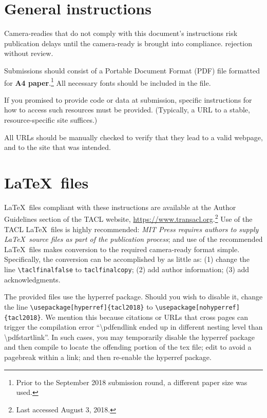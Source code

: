 \documentclass[11pt,a4paper]{article}
\newcommand{\Taclpaper}{Camera-ready\xspace}
\newcommand{\Taclpapers}{Camera-readies\xspace}
\newcommand{\Taclpaper}{Submission\xspace}
\newcommand{\Taclpapers}{{\Taclpaper}s\xspace}
\begin{document}
\section{General instructions}

\Taclpapers that do not comply with this document's instructions
risk
\iftaclfinal
publication delays until the camera-ready is brought into compliance.
\else
rejection without review.
\fi


Submissions should consist of a Portable Document Format (PDF) file formatted
for  \textbf{A4 paper}.\footnote{Prior to the September 2018 submission round, a
different paper size was used.} All necessary fonts should be
included in the  file.

If you promised to provide code or data at submission, specific instructions for
how to access such resources must be provided.  (Typically, a URL to a stable,
resource-specific site suffices.)

All URLs should be manually checked to verify that they
lead to a valid webpage, and to the site that was intended.



\section{\LaTeX\ files}

\LaTeX\ files compliant with these instructions are available at the
Author Guidelines section of the
TACL website, \href{https://www.transacl.org/}
{https://www.transacl.org}.\footnote{Last accessed August 3, 2018.} Use of the
TACL \LaTeX\ files is highly recommended: \emph{MIT Press requires authors to
supply \LaTeX\ source files as part of the publication process}; and
use of the recommended \LaTeX\ files makes conversion to the
required camera-ready format simple.
\iftaclfinal
Specifically, the conversion can be accomplished by as little as: (1) change the
line
\verb+\taclfinalfalse+ to \verb+taclfinalcopy+; (2) add author information;
(3) add acknowledgments.
\fi


The provided files use the hyperref package.  Should you wish to disable it,
change the line
\verb+\usepackage[hyperref]{tacl2018}+
to
\verb+\usepackage[nohyperref]{tacl2018}+.
We mention this because citations or URLs that cross pages can trigger the
compilation error ``{\textbackslash}pdfendlink ended up in different nesting
level than {\textbackslash}pdfstartlink''.  In such cases, you may temporarily
disable the hyperref package and then compile to locate the offending portion of
the tex file; edit to avoid a pagebreak within a link; and then re-enable the
hyperref package.
\end{document}
